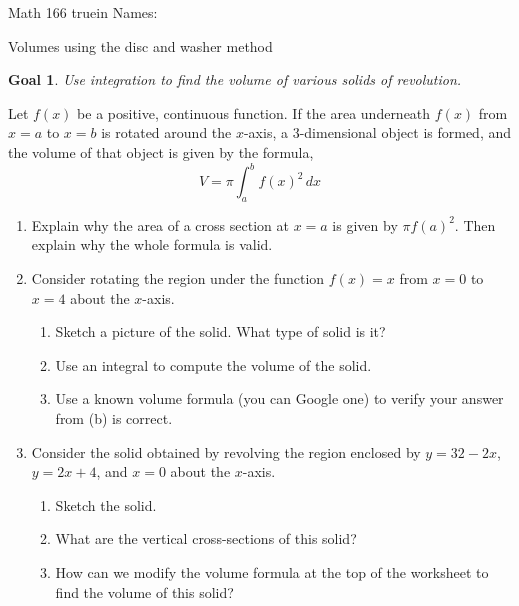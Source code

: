 \documentclass[12pt]{article}
\newtheorem*{goal}{Goal}
\begin{document}
\pagestyle{empty} %

\noindent
{Math 166  truein  Names:\ \hrulefill}

\noindent
{Volumes using the disc and washer method}

\medskip

\begin{goal} \rm
Use integration to find the volume of various \emph{solids of revolution}.
\end{goal}

 Let $f(x)$ be a positive, continuous function.  If the area underneath $f(x)$ from $x = a$ to $x = b$ is rotated around the $x$-axis, a $3$-dimensional object is formed, and the volume of that object is given by the formula,
\[
V = \pi \int_a^b f(x)^2 \, dx
\]
\begin{enumerate}
\item Explain why the area of a cross section at $x=a$ is given by $\pi f(a)^2$.  Then explain why the whole formula is valid. 
\vfill

\item Consider rotating the region under the function $f(x) = x$ from $x = 0$ to $x = 4$ about the $x$-axis.
\begin{enumerate}
\item Sketch a picture of the solid.  What type of solid is it?
\vfill
\item Use an integral to compute the volume of the solid.
\vfill
\item Use a known volume formula (you can Google one) to verify your answer from (b) is correct.
\vfill
\end{enumerate}

%


\pagebreak
\item Consider the solid obtained by revolving the region enclosed by $y=32-2x$, $y=2x+4$, and $x=0$ about the $x$-axis.
\begin{enumerate}
\item Sketch the solid.
\vfill


\item What are the vertical cross-sections of this solid?
\vfill
\item How can we modify the volume formula at the top of the worksheet to find the volume of this solid?
\vfill

\end{enumerate}
\end{enumerate}
\end{document}
